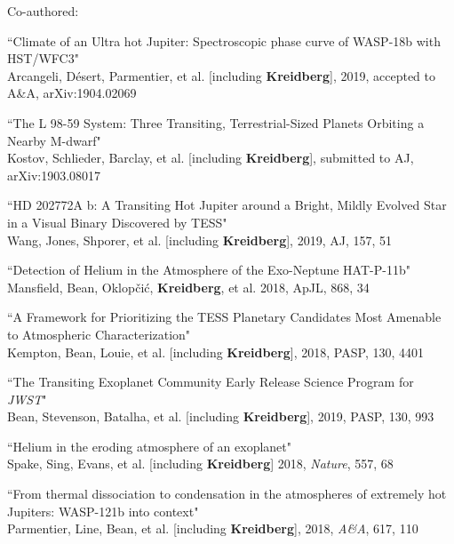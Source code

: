 \documentclass[12pt,letterpaper]{article}
\begin{document}
\vspace{3mm}
\hspace*{5mm}Co-authored:
\begin{compactenum}
\setcounter{enumi}{13}
\item ``Climate of an Ultra hot Jupiter: Spectroscopic phase curve of WASP-18b with HST/WFC3"\\
    Arcangeli, D\'esert, Parmentier, et al. [including \textbf{Kreidberg}], 2019, accepted to A\&A, arXiv:1904.02069 

\item ``The L 98-59 System: Three Transiting, Terrestrial-Sized Planets Orbiting a Nearby M-dwarf"\\
    Kostov, Schlieder, Barclay, et al. [including \textbf{Kreidberg}], submitted to AJ, arXiv:1903.08017

\item ``HD 202772A b: A Transiting Hot Jupiter around a Bright, Mildly Evolved Star in a Visual Binary Discovered by TESS"\\
    Wang, Jones, Shporer, et al. [including \textbf{Kreidberg}], 2019, AJ, 157, 51

\item ``Detection of Helium in the Atmosphere of the Exo-Neptune HAT-P-11b"\\
Mansfield, Bean, Oklop\v{c}i\'{c}, \textbf{Kreidberg}, et al. 2018, ApJL, 868, 34

\item ``A Framework for Prioritizing the TESS Planetary Candidates Most Amenable to Atmospheric Characterization"\\
   Kempton, Bean, Louie, et al. [including \textbf{Kreidberg}], 2018, PASP, 130, 4401 

\item  ``The Transiting Exoplanet Community Early Release Science Program for \textit{JWST}"\\
    Bean, Stevenson, Batalha, et al. [including \textbf{Kreidberg}], 2019, PASP, 130, 993 

\item ``Helium in the eroding atmosphere of an exoplanet"\\
    Spake, Sing, Evans, et al. [including \textbf{Kreidberg}] 2018, \textit{Nature}, 557, 68

\item ``From thermal dissociation to condensation in the atmospheres of extremely hot Jupiters: WASP-121b into context"\\
	Parmentier, Line, Bean, et al. [including \textbf{Kreidberg}], 2018, \textit{A\&A}, 617, 110


\end{compactenum}
\end{document}
